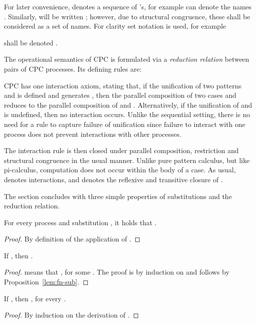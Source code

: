 \documentclass{LMCS}
\newcommand{\withsetnot}[2]{#2}
\begin{document}
For later convenience,  denotes a sequence of 's, for example
 can denote the names .
Similarly,  will be written ;
however, due to structural congruence, these shall be considered as a set of names.
\withsetnot{}{For clarity set notation is used, for example

shall be denoted .}

The operational semantics of CPC is formulated via a {\em reduction
relation}  between pairs of CPC processes.  Its defining
rules are:

CPC has one interaction axiom, stating that, if the unification of two
patterns  and  is defined and generates , then
the parallel composition of two cases  and  reduces
to the parallel composition of  and .
Alternatively, if the unification of  and  is undefined, then no
interaction occurs.
Unlike the sequential setting, there is no need for a rule to capture failure
of unification since failure to interact with one process does not
prevent interactions with other processes.

The interaction rule is then closed under parallel composition,
restriction and structural congruence in the usual manner. Unlike
pure pattern calculus, but like pi-calculus, computation does not occur within the body of a
case. As usual,  denotes  interactions, and  denotes the reflexive and transitive closure
of .

The section concludes with three simple properties of substitutions and the reduction relation.

\begin{prop}
\label{lem:fn-sub}
For every process  and substitution , it holds that .
\end{prop}
\begin{proof}
By definition of the application of .
\end{proof}

\begin{prop}
\label{prop:free_name_subset}
If , then .
\end{prop}
\begin{proof}
 means that , for some . The proof is by induction on 
and follows by Proposition~\ref{lem:fn-sub}.
\end{proof}

\begin{prop}
\label{red:renaming}
If , then , for every .
\end{prop}
\begin{proof}
By induction on the derivation of  .
\end{proof}
\end{document}

